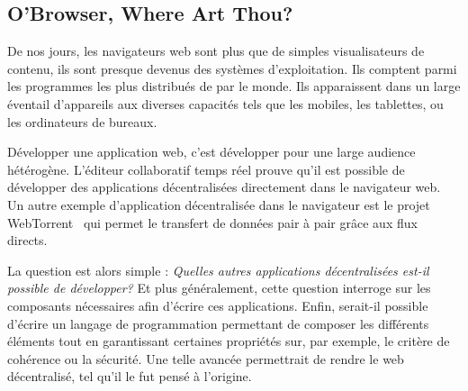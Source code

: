 \subsection{O'Browser, Where Art Thou?}

De nos jours, les navigateurs web sont plus que de simples visualisateurs de
contenu, ils sont presque devenus des systèmes d'exploitation. Ils comptent
parmi les programmes les plus distribués de par le monde. Ils apparaissent dans
un large éventail d'appareils aux diverses capacités tels que les mobiles, les
tablettes, ou les ordinateurs de bureaux.

Développer une application web, c'est développer pour une large audience
hétérogène.  L'éditeur collaboratif temps réel \CRATE prouve qu'il est possible
de développer des applications décentralisées directement dans le navigateur
web. Un autre exemple d'application décentralisée dans le navigateur est le
projet WebTorrent~\cite{webtorrent} qui permet le transfert de données pair à
pair grâce aux flux directs.

La question est alors simple : \emph{Quelles autres applications décentralisées
  est-il possible de développer?} Et plus généralement, cette question interroge
sur les composants nécessaires afin d'écrire ces applications. Enfin, serait-il
possible d'écrire un langage de programmation permettant de composer les
différents éléments tout en garantissant certaines propriétés sur, par exemple,
le critère de cohérence ou la sécurité. Une telle avancée permettrait de rendre
le web décentralisé, tel qu'il le fut pensé à l'origine.

